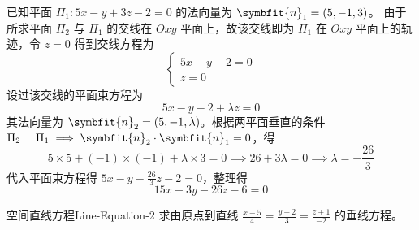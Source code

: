 \begin{solution}
    已知平面 $\Pi_1: 5x - y + 3z - 2 = 0$ 的法向量为 $\symbfit{n}_1 = (5, -1, 3)$。
    由于所求平面 $\Pi_2$ 与 $\Pi_1$ 的交线在 $Oxy$ 平面上，故该交线即为 $\Pi_1$ 在 $Oxy$ 平面上的轨迹，令 $z = 0$ 得到交线方程为
    \begin{equation}
        \begin{cases}
            5x - y - 2 = 0 \\
            z = 0
        \end{cases}
    \end{equation}
    设过该交线的平面束方程为
    \begin{equation}
        5x - y - 2 + \lambda z = 0
    \end{equation}
    其法向量为 $\symbfit{n}_2 = (5, -1, \lambda)$。根据两平面垂直的条件 $\Pi_2 \perp \Pi_1 \implies \symbfit{n}_2 \cdot \symbfit{n}_1 = 0$，得
    \begin{equation}
        5 \times 5 + (-1) \times (-1) + \lambda \times 3 = 0 \implies 26 + 3\lambda = 0 \implies \lambda = -\frac{26}{3}
    \end{equation}
    代入平面束方程得 $5x - y - \frac{26}{3}z - 2 = 0$，整理得
    \begin{equation}
        \boxed{15x - 3y - 26z - 6 = 0}
    \end{equation}
\end{solution}

\begin{problem}{空间直线方程}{Line-Equation-2}
    求由原点到直线 $\frac{x-5}{4} = \frac{y-2}{3} = \frac{z+1}{-2}$ 的垂线方程。
\end{problem}

